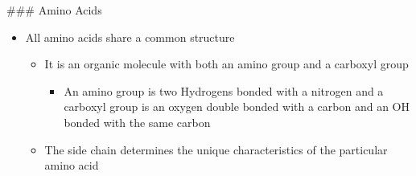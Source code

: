 \documentclass[letterpaper]{article}
\begin{document}
\#\#\# Amino Acids

\begin{itemize}
\item All amino acids share a common structure

\begin{itemize}
\item It is an organic molecule with both an amino group and a carboxyl
group

\begin{itemize}
\item An amino group is two Hydrogens bonded with a nitrogen and a
carboxyl group is an oxygen double bonded with a carbon and an OH
bonded with the same carbon
\end{itemize}

\item The side chain determines the unique characteristics of the
particular amino acid
\end{itemize}
\end{itemize}
\end{document}
